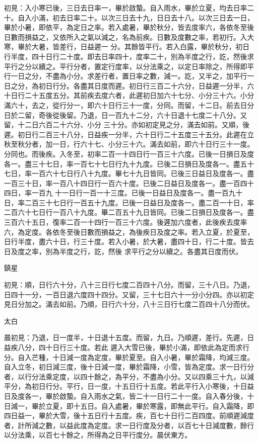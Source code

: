 \begin{pinyinscope}
 初見：入小寒已後，三日去日率一，畢於啟蟄。自入雨水，畢於立夏，均去日率二十。自入小滿，初去日率二十。以次三日去十九，日日去十八。以次三日去一日，畢於小暑，即依平，為定日之率。若入處暑，畢於秋分，皆去度率六，各依冬至後日數而損益之，又依所入之氣以減之，名為前疾。日數及度數之率，若初行。入大寒，畢於大暑，皆差行，日益遲一
 分。其餘皆平行。若入白露，畢於秋分，初日行半度，四十日行二十度。即去日率四十，度率二十，別為半度之行，訖，然後求平行之分以續之。平行分者，置定行度率，以分法乘之，以定日率除之，所得即平行一日之分，不盡為小分。求差行者，置日率之數，減一。訖，又半之，加平行一日之分，為初日行分。各盡其日度而遲。初日行三百二十六分，日益遲一分半，六十日行二十五度五分。其前疾去度六者，此遲初日加六十七分、小分三十六。小分滿六十，去之，從行分一，即六十日行三十一度，分同。而留，十二日。前去日分日於二留，奇後從後留。乃退，日一百九十二分，六十日退十七度二十八分。又留，十二日六百二十六分、小分
 三十分。亦如初定見之分，滿去如前。又順，後遲。初日行二百三十八分，日益疾一分半，六十日行二十五度三十五分。此遲在立秋至秋分者，加一日，行六十七、小分三十六。滿去如前，即六十日行三十一度。分同也。而後疾。入冬至，初率二百一十四日行一百三十六度。已後一日損日及度各一。盡三十七日，率一百七十七日行九十九度。已後二日損日及度各一。盡五十七日，率一百六十七日行八十九度。畢七十九日皆同。已後三日益日及度各一。盡一百三十日，率一百八十四日行一百六十度。已後二日益日及度各一。盡一百四十四日，率一百九
 十一日行一百一十三度。已後一日益日及度各一。盡一百九十日，率二百三十七日行一百五十九度。已後一日益日及度各一。盡二百一十日，率二百六十七日行一百八十九度。畢二百五十九日皆同。已後二日損日及度各一。盡三百六十五日，復率二百一十四行一百三十六度。後遲加六度者，此後疾去度率六，為定度。各依冬至後日數而損益之，為後疾日及度之率。若入立夏，於夏至，日行半度，盡六十日，行三十度。若入小暑，於大暑，盡四十日，行二十度。皆去日及度之率，別為半度之行，訖，然後
 求平行之分以續之。各盡其日度而伏。



 鎮星



 初見：順，日行六十分，八十三日行七度二百四十八分。而留，三十八日。乃退，日四十一分，一百日退六度四十四分。又留，三十七日六十一分小分四。亦以初定見日分加之。滿去如前。乃順，日行六十分，八十三日行七度二百四十八分而伏。



 太白



 晨初見：乃退，日一度半，十日退十五度。而留，九日。乃順遲，差行。先遲，日益疾八分，四十日行三十度。若此
 遲入大雪已後，畢於小滿，即依此為定而求行分。自入芒種，十日減一度為定度，畢於夏至。自入小暑，畢於霜降，均減三度。自入立冬，初日減三度，後十日減一度，畢於霜降，小雪，皆為定度。求一日行分者，以行分法乘定度，以四十餘之，為平分，不盡為小分。又以四乘三十九，以減平分，為初日行分。平行，日一度，十五日行十五度。若此平行入小寒後，十日益日及度各一，畢於啟蟄。自入雨水之氣，皆二十一日行二十一度。自入春分後，十日減一，畢於立夏，即十五日。自入處暑，畢於寒露，即無此平行。自入霜降，即四日益一，畢於大雪，後十五日行十五度。疾，百七十日行二百四度。前順遲減度者，計所減之數，以益此度為定度。求一日行度及分者，以百七十日減度數，餘行以分法乘，以百七十餘之，所得為之日平行度分。晨伏東方。




\end{pinyinscope}
